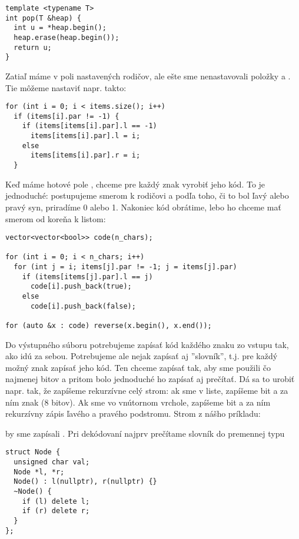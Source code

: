\begin{lstlisting}
template <typename T>
int pop(T &heap) {
  int u = *heap.begin();
  heap.erase(heap.begin());
  return u;
}
\end{lstlisting}


Zatiaľ máme v poli  nastavených rodičov, ale ešte sme nenastavovali
položky  a . Tie môžeme nastaviť napr. takto:

\begin{lstlisting}
for (int i = 0; i < items.size(); i++)
  if (items[i].par != -1) {
    if (items[items[i].par].l == -1)
      items[items[i].par].l = i;
    else
      items[items[i].par].r = i;
  }
\end{lstlisting}


Keď máme hotové pole , chceme pre každý znak vyrobiť jeho kód. To je
jednoduché: postupujeme smerom k rodičovi a podľa toho, či to bol ľavý alebo
pravý syn, priradíme 0 alebo 1. Nakoniec kód obrátime, lebo ho chceme mať smerom
od koreňa k listom:

\begin{lstlisting}
vector<vector<bool>> code(n_chars);

for (int i = 0; i < n_chars; i++)
  for (int j = i; items[j].par != -1; j = items[j].par)
    if (items[items[j].par].l == j)
      code[i].push_back(true);
    else
      code[i].push_back(false);

for (auto &x : code) reverse(x.begin(), x.end());
\end{lstlisting}


Do výstupného súboru potrebujeme zapísať kód každého znaku zo vstupu tak, ako idú za sebou. Potrebujeme ale
nejak zapísať aj ''slovník'', t.j. pre každý možný znak zapísať jeho kód. Ten chceme zapísať 
tak, aby sme použili čo najmenej bitov a pritom bolo jednoduché ho zapísať aj prečítať.
Dá sa to urobiť napr. tak, že zapíšeme rekurzívne celý strom: ak sme v liste, zapíšeme
bit  a za ním znak (8 bitov). Ak sme vo vnútornom vrchole, zapíšeme bit 
a za ním rekurzívny zápis ľavého a pravého podstromu. Strom z nášho príkladu:


\stromzobrazka


by sme zapísali .
Pri dekódovaní najprv prečítame slovník do premennej typu 

\begin{lstlisting}
struct Node {
  unsigned char val;
  Node *l, *r;
  Node() : l(nullptr), r(nullptr) {}
  ~Node() {
    if (l) delete l;
    if (r) delete r;
  }
};
\end{lstlisting}

